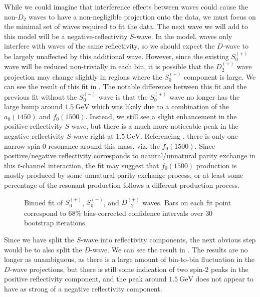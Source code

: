While we could imagine that interference effects between waves could cause the non-$D_2$ waves to have a non-negligible projection onto the data, we must focus on the minimal set of waves required to fit the data. The next wave we will add to this model will be a negative-reflectivity $S$-wave. In the model, waves only interfere with waves of the same reflectivity, so we should expect the $D$-wave to be largely unaffected by this additional wave. However, since the existing $S_0^{(+)}$ wave will be reduced non-trivially in each bin, it is possible that the $D_2^{(+)}$ wave projection may change slightly in regions where the $S_0^{(-)}$ component is large. We can see the result of this fit in . The notable difference between this fit and the previous fit without the $S_0^{(-)}$ wave is that the $S_0^{(+)}$ wave no longer has the large bump around $\SI{1.5}{\giga\electronvolt}$ which was likely due to a combination of the $a_0(1450)$ and $f_0(1500)$. Instead, we still see a slight enhancement in the positive-reflectivity $S$-wave, but there is a much more noticeable peak in the negative-reflectivity $S$-wave right at $\SI{1.5}{\giga\electronvolt}$. Referencing , there is only one narrow spin-$0$ resonance around this mass, viz. the $f_0(1500)$. Since positive/negative reflectivity corresponds to natural/unnatural parity exchange in this $t$-channel interaction, the fit may suggest that $f_0(1500)$ production is mostly produced by some unnatural parity exchange process, or at least some percentage of the resonant production follows a different production process.

\begin{figure}
  \begin{center}
    
  \end{center}
  \caption{Binned fit of $S_{0}^{(+)}$, $S_{0}^{(-)}$, and $D_{+2}^{(+)}$ waves. Bars on each fit point correspond to $68\%$ bias-corrected confidence intervals over $ 30 $ bootstrap iterations.}\label{fig:binned-fit-chisqdof-3.0-Spn-D2p}
\end{figure}

Since we have split the $S$-wave into reflectivity components, the next obvious step would be to also split the $D$-wave. We can see the result in . The results are no longer as unambiguous, as there is a large amount of bin-to-bin fluctuation in the $D$-wave projections, but there is still some indication of two spin-$2$ peaks in the positive reflectivity component, and the peak around $\SI{1.5}{\giga\electronvolt}$ does not appear to have as strong of a negative reflectivity component.

